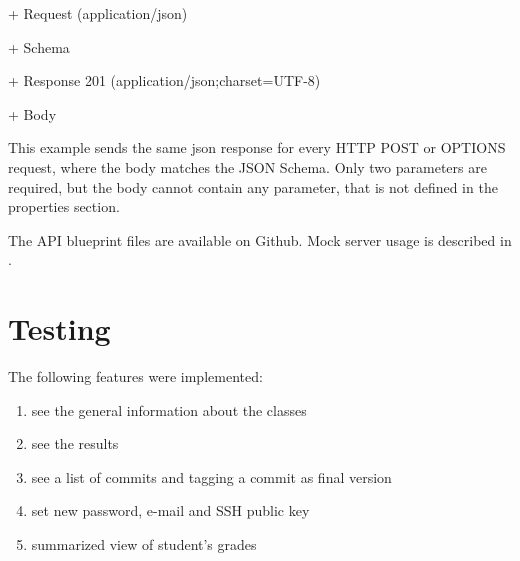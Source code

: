 + Request (application/json)
\begin{addmargin}[1em]{1em}
	+ Schema
		\begin{addmargin}[1em]{1em}
		\end{addmargin}
\end{addmargin}

+ Response 201 (application/json;charset=UTF-8)
\begin{addmargin}[1em]{1em}
	+ Body
	\begin{addmargin}[1em]{1em}
	\end{addmargin}
\end{addmargin}
	
This example sends the same json response for every HTTP POST or OPTIONS request, where the body matches the JSON Schema. Only two parameters are required, but the body cannot contain any parameter, that is not defined in the properties section.

The API blueprint files are available on Github. Mock server usage is described in .


\section{Testing}
The following features were implemented:

\begin{enumerate}
	\item see the general information about the classes
	\setcounter{enumi}{0}
	\item see the results
	\item see a list of commits and tagging a commit as final version
	\setcounter{enumi}{1}
	\item set new password, e-mail and SSH public key
	\item summarized view of student's grades
\end{enumerate}

